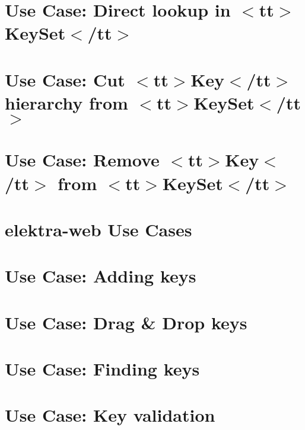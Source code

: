 \let\mypdfximage\pdfximage\def\pdfximage{\immediate\mypdfximage}\documentclass[twoside]{book}
\newcommand{\+}{\discretionary{\mbox{\scriptsize$\hookleftarrow$}}{}{}}
\begin{document}
\chapter{Use Case\+: Direct lookup in $<$tt$>$Key\+Set$<$/tt$>$}
\label{doc_usecases_core_UC_keyset_lookup_direct_md}

\chapter{Use Case\+: Cut $<$tt$>$Key$<$/tt$>$ hierarchy from $<$tt$>$Key\+Set$<$/tt$>$}
\label{doc_usecases_core_UC_keyset_lookup_hierarchy_md}

\chapter{Use Case\+: Remove $<$tt$>$Key$<$/tt$>$ from $<$tt$>$Key\+Set$<$/tt$>$}
\label{doc_usecases_core_UC_keyset_remove_md}

\chapter{elektra-\/web Use Cases}
\label{doc_usecases_elektra_web_README_md}

\chapter{Use Case\+: Adding keys}
\label{doc_usecases_elektra_web_UC_adding_keys_md}

\chapter{Use Case\+: Drag \& Drop keys}
\label{doc_usecases_elektra_web_UC_drag_n_drop_md}

\chapter{Use Case\+: Finding keys}
\label{doc_usecases_elektra_web_UC_finding_keys_md}

\chapter{Use Case\+: Key validation}
\label{doc_usecases_elektra_web_UC_key_validation_md}

\end{document}
